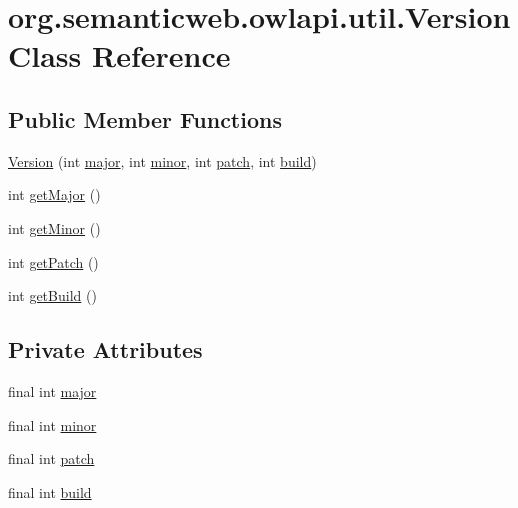 \hypertarget{classorg_1_1semanticweb_1_1owlapi_1_1util_1_1_version}{\section{org.\-semanticweb.\-owlapi.\-util.\-Version Class Reference}
\label{classorg_1_1semanticweb_1_1owlapi_1_1util_1_1_version}
}
\subsection*{Public Member Functions}
\begin{DoxyCompactItemize}
\item 
\hyperlink{classorg_1_1semanticweb_1_1owlapi_1_1util_1_1_version_a79b25b901bff9b0a32e6105b2bc5d257}{Version} (int \hyperlink{classorg_1_1semanticweb_1_1owlapi_1_1util_1_1_version_a1950f12db9b2e11e52c1a252fc9b1d3d}{major}, int \hyperlink{classorg_1_1semanticweb_1_1owlapi_1_1util_1_1_version_ab61c056ab7f64351186885c27523fb46}{minor}, int \hyperlink{classorg_1_1semanticweb_1_1owlapi_1_1util_1_1_version_a8b44efb10df1048d6b13c557a92f120d}{patch}, int \hyperlink{classorg_1_1semanticweb_1_1owlapi_1_1util_1_1_version_ac977ed0c5ca74a30da981e5fd601c8f5}{build})
\item 
int \hyperlink{classorg_1_1semanticweb_1_1owlapi_1_1util_1_1_version_a3e5f6d86541a984c4e40ee6eda222ec3}{get\-Major} ()
\item 
int \hyperlink{classorg_1_1semanticweb_1_1owlapi_1_1util_1_1_version_a202f2fe767d4c87c949e7e983c89198a}{get\-Minor} ()
\item 
int \hyperlink{classorg_1_1semanticweb_1_1owlapi_1_1util_1_1_version_a4972f9dd9c0daf6d81215594a5155456}{get\-Patch} ()
\item 
int \hyperlink{classorg_1_1semanticweb_1_1owlapi_1_1util_1_1_version_a22763d132af4087d28113adefced829e}{get\-Build} ()
\end{DoxyCompactItemize}
\subsection*{Private Attributes}
\begin{DoxyCompactItemize}
\item 
final int \hyperlink{classorg_1_1semanticweb_1_1owlapi_1_1util_1_1_version_a1950f12db9b2e11e52c1a252fc9b1d3d}{major}
\item 
final int \hyperlink{classorg_1_1semanticweb_1_1owlapi_1_1util_1_1_version_ab61c056ab7f64351186885c27523fb46}{minor}
\item 
final int \hyperlink{classorg_1_1semanticweb_1_1owlapi_1_1util_1_1_version_a8b44efb10df1048d6b13c557a92f120d}{patch}
\item 
final int \hyperlink{classorg_1_1semanticweb_1_1owlapi_1_1util_1_1_version_ac977ed0c5ca74a30da981e5fd601c8f5}{build}
\end{DoxyCompactItemize}


